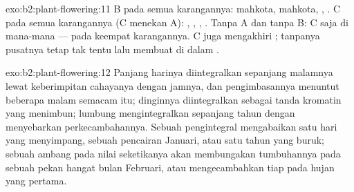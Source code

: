 \begin{solution}{exo:b2:plant-flowering:11}
B pada semua karangannya: mahkota, mahkota, , .
C pada semua karangannya (C menekan A): , , , . Tanpa A dan tanpa B: C saja di mana-mana --- 
pada keempat karangannya. C juga mengakhiri ; tanpanya
pusatnya tetap tak tentu lalu membuat  di dalam .
\end{solution}

\begin{solution}{exo:b2:plant-flowering:12}
Panjang harinya diintegralkan sepanjang malamnya lewat keberimpitan
cahayanya dengan jamnya, dan pengimbasannya menuntut beberapa malam
semacam itu; dinginnya diintegralkan sebagai tanda kromatin yang
menimbun; lumbung  mengintegralkan sepanjang tahun dengan
menyebarkan perkecambahannya. Sebuah pengintegral mengabaikan satu hari
yang menyimpang, sebuah pencairan Januari, atau satu tahun yang buruk;
sebuah ambang pada nilai seketikanya akan membungakan tumbuhannya pada
sebuah pekan hangat bulan Februari, atau mengecambahkan tiap 
pada hujan yang pertama.
\end{solution}

